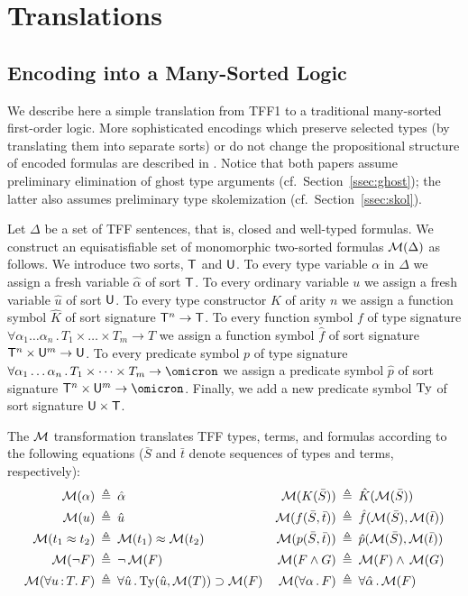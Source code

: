 \section{Translations} \label{sec:trans}

\subsection{Encoding into a Many-Sorted Logic} \label{ssec:tff0}

We describe here a simple translation from TFF1 to a traditional
many-sorted first-order logic. More sophisticated encodings which
preserve selected types (by translating them into separate sorts)
or do not change the propositional structure of encoded formulas
are described in \cite{leino10tacas,bobot11frocos}.
Notice that both papers assume preliminary elimination
of ghost type arguments (cf.~Section~\ref{ssec:ghost});
the latter also assumes preliminary type skolemization
(cf.~Section~\ref{ssec:skol}).

Let $\Delta$ be a set of TFF sentences, that is, closed and well-typed
formulas. We construct an equisatisfiable set of monomorphic two-sorted
formulas $\mathcal{M}(\Delta)$ as follows.
%
We introduce two sorts, $\mathsf{T}$ and $\mathsf{U}$.
To every type variable $\alpha$ in $\Delta$ we assign
a fresh variable $\hat{\alpha}$ of sort $\mathsf{T}$.
To every ordinary variable $u$ we assign
a fresh variable $\hat{u}$ of sort $\mathsf{U}$.
To every type constructor $K$ of arity $n$ we assign
a function symbol $\hat{K}$ of sort signature $\mathsf{T}^n \to \mathsf{T}$.
To every function symbol $f$ of type signature
$\forall \alpha_1\dots\alpha_n \,.\, T_1 \times \dots \times T_m \to T$
we assign a function symbol $\hat{f}$ of sort signature
$\mathsf{T}^n \times \mathsf{U}^m \to \mathsf{U}$.
To every predicate symbol $p$ of type signature
$\forall \alpha_1\dots\alpha_n \,.\, T_1 \times \dots \times T_m \to \omicron$
we assign a predicate symbol $\hat{p}$ of sort signature
$\typ^n \times \und^m \to \omicron$.
Finally, we add a new predicate symbol $\mathrm{Ty}$ of sort signature
$\mathsf{U} \times \mathsf{T}$.

The $\mathcal{M}$ transformation translates TFF types, terms, and formulas
according to the following equations ($\bar{S}$ and $\bar{t}$ denote
sequences of types and terms, respectively):
\begin{align*}
\mathcal{M}(\alpha) &\:\triangleq\: \hat{\alpha} &
\mathcal{M}(K(\bar{S})) &\:\triangleq\: \hat{K}(\mathcal{M}(\bar{S})) \\
\mathcal{M}(u) &\:\triangleq\: \hat{u} &
\mathcal{M}(f(\bar{S},\bar{t})) &\:\triangleq\: \hat{f}(\mathcal{M}(\bar{S}),\mathcal{M}(\bar{t})) \\
\mathcal{M}(t_1 \approx t_2) &\:\triangleq\: \mathcal{M}(t_1) \approx \mathcal{M}(t_2) &
\mathcal{M}(p(\bar{S},\bar{t})) &\:\triangleq\: \hat{p}(\mathcal{M}(\bar{S}),\mathcal{M}(\bar{t})) \\
\mathcal{M}(\lnot F) &\:\triangleq\: \lnot\, \mathcal{M}(F) &
\mathcal{M}(F \land G) &\:\triangleq\: \mathcal{M}(F) \land\, \mathcal{M}(G) \\
\mathcal{M}(\forall u \operatorname{:} T .\, F) &\:\triangleq\:
\forall \hat{u} \,.\, \mathrm{Ty}(\hat{u}, \mathcal{M}(T)) \supset \mathcal{M}(F) &
\mathcal{M}(\forall \alpha \,.\, F) &\:\triangleq\:
\forall \hat{\alpha} \,.\, \mathcal{M}(F)
\end{align*}

